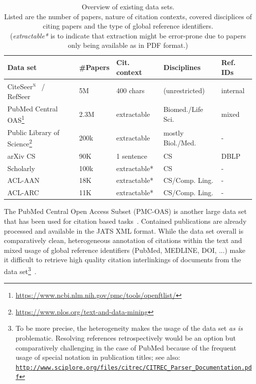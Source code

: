 \begin{table}
\centering
    \caption[Overview of existing data sets.]{Overview of existing data sets.\\Listed are the number of papers, nature of citation contexts, covered disciplices of citing papers and the type of global reference identifiers.\\(\emph{extractable*} is to indicate that extraction might be error-prone due to papers only being available as in PDF format.)}
    \label{tab:datasets}
\begin{center}
    \begin{tabular}{lllll}
    \toprule
    Data set & \#Papers & Cit. context & Disciplines & Ref. IDs \\
    \midrule
    CiteSeer\textsuperscript{x}~\cite{Caragea2014} / RefSeer~\cite{Huang2014} & 5M & 400 chars & (unrestricted) & internal \\
    PubMed Central OAS\footnote{\url{https://www.ncbi.nlm.nih.gov/pmc/tools/openftlist/}} & 2.3M & extractable & Biomed./Life Sci. & mixed \\
    Public Library of Science\footnote{\url{https://www.plos.org/text-and-data-mining}} & 200k & extractable & mostly Biol./Med. & - \\
    arXiv CS~\cite{Faerber2018} &  90K & 1 sentence & CS & DBLP \\
    Scholarly~\cite{Sugiyama2013}  & 100k & extractable* & CS & - \\
    ACL-AAN~\cite{Radev2013} & 18K & extractable* & CS/Comp. Ling. & -  \\
    ACL-ARC~\cite{Bird2008} & 11K & extractable* & CS/Comp. Ling. & - \\
    \bottomrule
    \end{tabular}
\end{center}
\end{table}


The PubMed Central Open Access Subset (PMC-OAS) is another large data set that has been used for citation based tasks~\cite{Duma2016,Gipp2015,Galke2018,Bhagavatula2018}. Contained publications are already processed and available in the JATS\cite{Huh2014} XML format. While the data set overall is comparatively clean, heterogeneous annotation of citations within the text and mixed usage of global reference identifiers (PubMed, MEDLINE, DOI, ...) make it difficult to retrieve high quality citation interlinkings of documents from the data set\footnote{To be more precise, the heterogeneity makes the usage of the data set \emph{as is} problematic. Resolving references retrospectively would be an option but comparatively challenging in the case of PubMed because of the frequent usage of special notation in publication titles; see also: \texttt{\url{http://www.sciplore.org/files/citrec/CITREC_Parser_Documentation.pdf}}}~\cite{Gipp2015}.

